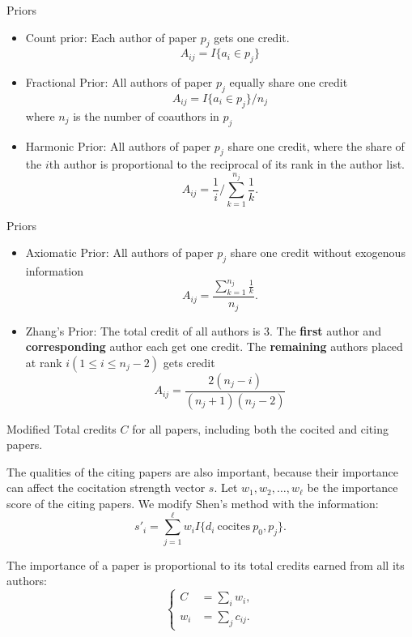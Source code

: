 \documentclass{beamer}
\begin{document}
\begin{frame}{Priors}
\begin{itemize}
\item Count prior: Each author of paper $p_j$ gets one credit.
\[A_{ij} = I\{a_i\in p_j\}\]
\item Fractional Prior: All authors of paper $p_j$ equally share one credit
\[A_{ij}=I\{a_i\in p_j\}/n_j\]
where $n_j$ is the number of coauthors in $p_j$
\item Harmonic Prior: All authors of paper $p_j$ share one credit, where the share of the $i$th author is proportional to the reciprocal of its rank in the author list.
\[
A_{ij}=\frac{1}{i}/\sum_{k=1}^{n_j} \frac{1}{k}.
\]
\end{itemize}
\end{frame}

\begin{frame}{Priors}
\begin{itemize}
\item Axiomatic Prior: All authors of paper $p_j$ share one credit without exogenous information
\[
A_{ij}=\frac{\sum_{k=1}^{n_j} \frac{1}{k}}{n_j}.
\]
\item Zhang's Prior: The total credit of all authors is $3$. The \textbf{first} author and \textbf{corresponding} author each get one credit. The \textbf{remaining} authors placed at rank $i (1\le i\le n_j-2)$ gets credit
\[
A_{ij} = \frac{2(n_j-i)}{(n_j+1)(n_j-2)}
\]
\end{itemize}
\end{frame}

\begin{frame}{Modified}
Total credits $C$ for all papers, including both the cocited and citing papers.

The qualities of the citing papers are also important, because their importance can affect the cocitation strength vector $s$. Let $w_1,w_2,\ldots,w_\ell$ be the importance score of the citing papers. We modify Shen's method with the information:
\[
s'_i = \sum_{j=1}^{\ell} w_i I\{d_i~\textrm{cocites}~p_0,p_j\}.
\]

The importance of a paper is proportional to its total credits earned from all its authors:
\[
\left\{
\begin{array}{rl}
C & = \sum_i w_i,\\ 
w_i & = \sum_j c_{ij}.
\end{array}
\right.
\]

\end{frame}
\end{document}
